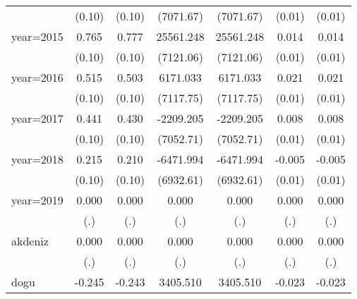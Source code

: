 {\begin{tabular}{l*{6}{c}}
                    &      (0.10)         &      (0.10)         &   (7071.67)         &   (7071.67)         &      (0.01)         &      (0.01)         \\
year=2015           &       0.765\sym{***}&       0.777\sym{***}&   25561.248\sym{***}&   25561.248\sym{***}&       0.014         &       0.014         \\
                    &      (0.10)         &      (0.10)         &   (7121.06)         &   (7121.06)         &      (0.01)         &      (0.01)         \\
year=2016           &       0.515\sym{***}&       0.503\sym{***}&    6171.033         &    6171.033         &       0.021\sym{**} &       0.021\sym{**} \\
                    &      (0.10)         &      (0.10)         &   (7117.75)         &   (7117.75)         &      (0.01)         &      (0.01)         \\
year=2017           &       0.441\sym{***}&       0.430\sym{***}&   -2209.205         &   -2209.205         &       0.008         &       0.008         \\
                    &      (0.10)         &      (0.10)         &   (7052.71)         &   (7052.71)         &      (0.01)         &      (0.01)         \\
year=2018           &       0.215\sym{*}  &       0.210\sym{*}  &   -6471.994         &   -6471.994         &      -0.005         &      -0.005         \\
                    &      (0.10)         &      (0.10)         &   (6932.61)         &   (6932.61)         &      (0.01)         &      (0.01)         \\
year=2019           &       0.000         &       0.000         &       0.000         &       0.000         &       0.000         &       0.000         \\
                    &         (.)         &         (.)         &         (.)         &         (.)         &         (.)         &         (.)         \\
akdeniz             &       0.000         &       0.000         &       0.000         &       0.000         &       0.000         &       0.000         \\
                    &         (.)         &         (.)         &         (.)         &         (.)         &         (.)         &         (.)         \\
dogu                &      -0.245\sym{**} &      -0.243\sym{**} &    3405.510         &    3405.510         &      -0.023\sym{***}&      -0.023\sym{***}\\

\end{tabular}}
